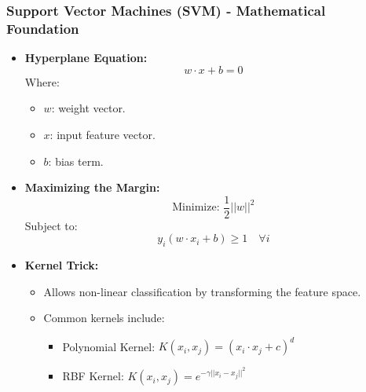 \documentclass[aspectratio=169]{beamer}
\begin{document}
\begin{frame}[fragile]
    \frametitle{Support Vector Machines (SVM) - Mathematical Foundation}
    \begin{itemize}
        \item \textbf{Hyperplane Equation:} 
        \begin{equation}
            w \cdot x + b = 0
        \end{equation}
        Where:
        \begin{itemize}
            \item \( w \): weight vector.
            \item \( x \): input feature vector.
            \item \( b \): bias term.
        \end{itemize}

        \item \textbf{Maximizing the Margin:}
        \begin{equation}
            \text{Minimize: } \frac{1}{2} ||w||^2
        \end{equation}
        Subject to:
        \begin{equation}
            y_i (w \cdot x_i + b) \geq 1 \quad \forall i
        \end{equation}

        \item \textbf{Kernel Trick:} 
        \begin{itemize}
            \item Allows non-linear classification by transforming the feature space.
            \item Common kernels include:
                \begin{itemize}
                    \item Polynomial Kernel: \( K(x_i, x_j) = (x_i \cdot x_j + c)^d \)
                    \item RBF Kernel: \( K(x_i, x_j) = e^{-\gamma ||x_i - x_j||^2} \)
                \end{itemize}
        \end{itemize}
    \end{itemize}
\end{frame}
\end{document}
